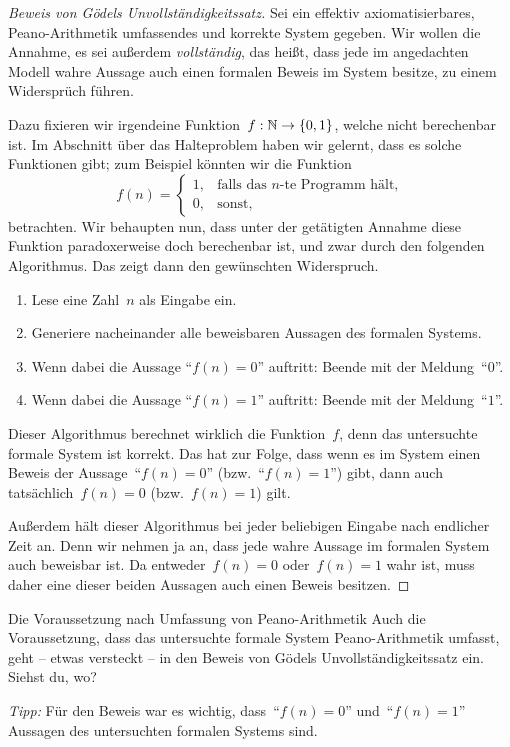 \documentclass[twoside]{../zirkelblatt1415}
\theoremstyle{definition}
\theoremstyle{plain}
\theoremstyle{remark}
\newenvironment{listing}{
  \renewcommand*\theenumi{\arabic{enumi}}
  \renewcommand{\labelenumi}{\theenumi.}
  \begin{enumerate}\itemsep0em}{\end{enumerate}}
\begin{document}
\begin{proof}[Beweis von Gödels Unvollständigkeitssatz]
Sei ein effektiv axiomatisierbares, Peano-Arith\-me\-tik umfassendes und
korrekte System gegeben. Wir wollen die Annahme, es sei außerdem
\emph{vollständig}, das heißt, dass jede im angedachten Modell wahre Aussage
auch einen formalen Beweis im System besitze, zu einem Widersprüch führen.

Dazu fixieren wir irgendeine Funktion~$f : \mathbb{N} \to \{0,1\}$, welche nicht
berechenbar ist. Im Abschnitt über das Halteproblem haben wir gelernt, dass es
solche Funktionen gibt; zum Beispiel könnten wir die Funktion
\[ f(n) = \begin{cases}1, & \text{falls das~$n$-te Programm hält,} \\
0, & \text{sonst,}\end{cases} \]
betrachten. Wir behaupten nun, dass unter der getätigten Annahme diese Funktion
paradoxerweise doch berechenbar ist, und zwar durch den folgenden Algorithmus.
Das zeigt dann den gewünschten Widerspruch.
\begin{listing}
\item Lese eine Zahl~$n$ als Eingabe ein.
\item Generiere nacheinander alle beweisbaren Aussagen des formalen Systems.
\item Wenn dabei die Aussage "`$f(n) = 0$"' auftritt: Beende mit der
Meldung~"`$0$"'.
\item Wenn dabei die Aussage "`$f(n) = 1$"' auftritt: Beende mit der
Meldung~"`$1$"'.
\end{listing}
Dieser Algorithmus berechnet wirklich die Funktion~$f$, denn das untersuchte
formale System ist korrekt. Das hat zur Folge, dass wenn es im System einen
Beweis der Aussage~"`$f(n) = 0$"' (bzw.~"`$f(n) = 1$"') gibt, dann auch
tatsächlich~$f(n) = 0$ (bzw.~$f(n) = 1$) gilt.

Außerdem hält dieser Algorithmus bei jeder beliebigen Eingabe nach endlicher
Zeit an. Denn wir nehmen ja an, dass jede wahre Aussage im formalen System auch
beweisbar ist. Da entweder~$f(n) = 0$ oder~$f(n) = 1$ wahr ist, muss daher eine
dieser beiden Aussagen auch einen Beweis besitzen.
\end{proof}

\begin{aufgabe}{Die Voraussetzung nach Umfassung von Peano-Arithmetik}
Auch die Voraussetzung, dass das untersuchte formale System Peano-Arithmetik
umfasst, geht -- etwas versteckt -- in den Beweis von Gödels
Unvollständigkeitssatz ein. Siehst du, wo?

\emph{Tipp:} Für den Beweis war es wichtig, dass~"`$f(n) = 0$"' und~"`$f(n) =
1$"' Aussagen des untersuchten formalen Systems sind.
\end{aufgabe}
\end{document}
